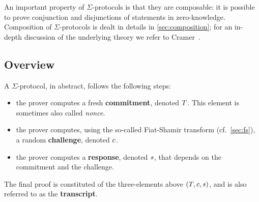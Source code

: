 \documentclass[11pt]{article}
\begin{document}
An important property of $\Sigma$-protocols is that they are composable: it is possible to prove conjunction and disjunctions of statements in zero-knowledge.
Composition of $\Sigma$-protocols is dealt in details in \cref{sec:composition}; for an in-depth discussion of the underlying theory we refer to Cramer~\cite{cramer97}.



\subsection{Overview}
A $\Sigma$-protocol, in abstract, follows the following steps:
\begin{itemize}
  \item the prover computes a fresh \textbf{commitment}, denoted $T$. This element is sometimes also called \emph{nonce}.
  \item the prover computes, using the so-called Fiat-Shamir transform (cf.~\cref{sec:fs}), a random \textbf{challenge}, denoted $c$.
  \item the prover computes a \textbf{response}, denoted $s$, that depends on the commitment and the challenge.
\end{itemize}
The final proof is constituted of the three-elements above $(T, c, s)$, and is also referred to as the \textbf{transcript}.
\end{document}
